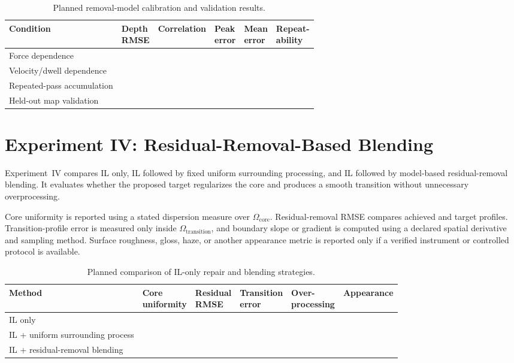 \begin{table}[t]
\centering
\caption{Planned removal-model calibration and validation results.}
\label{tab:removal_calibration}
\scriptsize
\begin{tabularx}{\textwidth}{p{}XXXXX}
\toprule
Condition & \makecell{Depth\\RMSE} & Correlation & \makecell{Peak\\error} & \makecell{Mean\\error} & \makecell{Repeat-\\ability} \\
\midrule
Force dependence & & & & & \\
Velocity/dwell dependence & & & & & \\
Repeated-pass accumulation & & & & & \\
Held-out map validation & & & & & \\
\bottomrule
\end{tabularx}
\end{table}

\section{Experiment IV: Residual-Removal-Based Blending}
Experiment~IV compares IL only, IL followed by fixed uniform surrounding processing, and IL followed by model-based residual-removal blending. It evaluates whether the proposed target regularizes the core and produces a smooth transition without unnecessary overprocessing.

Core uniformity is reported using a stated dispersion measure over \(\Omega_{\mathrm{core}}\). Residual-removal RMSE compares achieved and target profiles. Transition-profile error is measured only inside \(\Omega_{\mathrm{transition}}\), and boundary slope or gradient is computed using a declared spatial derivative and sampling method. Surface roughness, gloss, haze, or another appearance metric is reported only if a verified instrument or controlled protocol is available.

\begin{table}[t]
\centering
\caption{Planned comparison of IL-only repair and blending strategies.}
\label{tab:blending_ablation}
\scriptsize
\begin{tabularx}{\textwidth}{p{}XXXXX}
\toprule
Method & \makecell{Core\\uniformity} & \makecell{Residual\\RMSE} & \makecell{Transition\\error} & \makecell{Over-\\processing} & Appearance \\
\midrule
IL only & & & & & \\
IL + uniform surrounding process & & & & & \\
IL + residual-removal blending & & & & & \\
\bottomrule
\end{tabularx}
\end{table}

